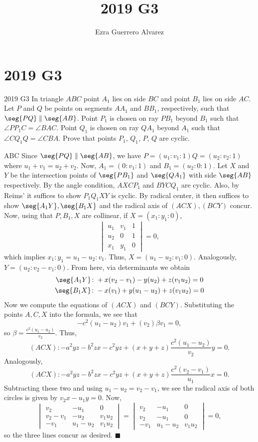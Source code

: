 \documentclass[14pt]{article}
\title{2019 G3}
\author{Ezra Guerrero Alvarez}
\begin{document}
\maketitle
	
\section*{2019 G3}

\begin{statement}{2019 G3}
	In triangle $ABC$ point $A_1$ lies on side $BC$
	and point $B_1$ lies on side $AC$.
	Let $P$ and $Q$ be points on segments $AA_1$ and $BB_1$,
	respectively, such that $\seg{PQ} \parallel \seg{AB}$.
	Point $P_1$ is chosen on ray $PB_1$ beyond $B_1$
	such that $\angle PP_1C = \angle BAC$.
	Point $Q_1$ is chosen on ray $QA_1$ beyond $A_1$
	such that $\angle CQ_1Q = \angle CBA$.
	Prove that points $P_1$, $Q_1$, $P$, $Q$ are cyclic.
\end{statement}
\bary ABC Since $\seg{PQ}\parallel\seg{AB}$, we have $P=(u_1:v_1:1) Q=(u_2:v_2:1)$ where $u_1+v_1=u_2+v_2$. Now, $A_1=(0:v_1:1)$ and $B_1=(u_2:0:1)$. Let $X$ and $Y$ be the intersection points of $\seg{PB_1}$ and $\seg{QA_1}$ with side $\seg{AB}$ respectively. By the angle condition, $AXCP_1$ and $BYCQ_1$ are cyclic. Also, by Reims' it suffices to show $P_1Q_1XY$ is cyclic. By radical center, it then suffices to show $\seg{A_1Y},\seg{B_1X}$ and the radical axis of $(ACX),(BCY)$ concur. Now, using that $P,B_1,X$ are collinear, if $X=(x_1:y_1:0)$,
\[ \begin{vmatrix}
	u_1&v_1&1\\
	u_2&0&1\\
	x_1&y_1&0
\end{vmatrix}=0, \]
which implies $x_1:y_1=u_1-u_2:v_1$. Thus, $X=(u_1-u_2:v_1:0)$. Analogously, $Y=(u_2:v_2-v_1:0)$. From here, via determinants we obtain
\begin{align*}
	\seg{A_1Y}&\colon +x(v_2-v_1)-y(u_2)+z(v_1u_2)=0\\
	\seg{B_1X}&\colon -x(v_1)+y(u_1-u_2)+z(v_1u_2)=0
\end{align*}
Now we compute the equations of $(ACX)$ and $(BCY)$. Substituting the points $A,C,X$ into the formula, we see that 
\[ -c^2(u_1-u_2)v_1+(v_2)\beta v_1=0, \]
so $\beta=\frac{c^2(u_1-u_2)}{v_2}$. Thus,
\[ (ACX)\colon -a^2yz-b^2zx-c^2yz+(x+y+z)\frac{c^2(u_1-u_2)}{v_2}y=0. \]
Analogously, 
\[ (ACX)\colon -a^2yz-b^2zx-c^2yz+(x+y+z)\frac{c^2(v_2-v_1)}{u_1}x=0. \]
Subtracting these two and using $u_1-u_2=v_2-v_1$, we see the radical axis of both circles is given by $v_2x-u_1y=0$. Now, 
\[ \begin{vmatrix}
	v_2&-u_1&0\\
	v_2-v_1&-u_2&v_1u_2\\
	-v_1&u_1-u_2&v_1u_2
\end{vmatrix} = \begin{vmatrix}
	v_2&-u_1&0\\
	v_2&-u_1&0\\
	-v_1&u_1-u_2&v_1u_2
\end{vmatrix}=0, \]
so the three lines concur as desired. $\blacksquare$
	
\end{document}
